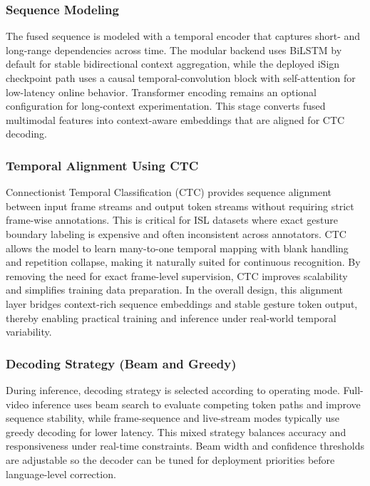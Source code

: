 \subsubsection{Sequence Modeling  }
The fused sequence is modeled with a temporal encoder that captures short- and long-range dependencies across time. The modular backend uses BiLSTM by default for stable bidirectional context aggregation, while the deployed iSign checkpoint path uses a causal temporal-convolution block with self-attention for low-latency online behavior. Transformer encoding remains an optional configuration for long-context experimentation. This stage converts fused multimodal features into context-aware embeddings that are aligned for CTC decoding.

\subsubsection{Temporal Alignment Using CTC}
Connectionist Temporal Classification (CTC) provides sequence alignment between input frame streams and output token streams without requiring strict frame-wise annotations. This is critical for ISL datasets where exact gesture boundary labeling is expensive and often inconsistent across annotators. CTC allows the model to learn many-to-one temporal mapping with blank handling and repetition collapse, making it naturally suited for continuous recognition. By removing the need for exact frame-level supervision, CTC improves scalability and simplifies training data preparation. In the overall design, this alignment layer bridges context-rich sequence embeddings and stable gesture token output, thereby enabling practical training and inference under real-world temporal variability.

\subsubsection{Decoding Strategy (Beam and Greedy)}
During inference, decoding strategy is selected according to operating mode. Full-video inference uses beam search to evaluate competing token paths and improve sequence stability, while frame-sequence and live-stream modes typically use greedy decoding for lower latency. This mixed strategy balances accuracy and responsiveness under real-time constraints. Beam width and confidence thresholds are adjustable so the decoder can be tuned for deployment priorities before language-level correction.

